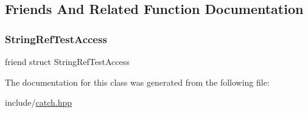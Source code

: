 \subsection{Friends And Related Function Documentation}
\mbox{\label{classCatch_1_1StringRef_a420e64e1652de1b0d427775781b018f5}} 
\subsubsection{\texorpdfstring{String\+Ref\+Test\+Access}{StringRefTestAccess}}
{\footnotesize\ttfamily friend struct String\+Ref\+Test\+Access\hspace{0.3cm}{\ttfamily [friend]}}



The documentation for this class was generated from the following file\+:\begin{DoxyCompactItemize}
\item 
include/\mbox{\hyperlink{catch_8hpp}{catch.\+hpp}}\end{DoxyCompactItemize}
